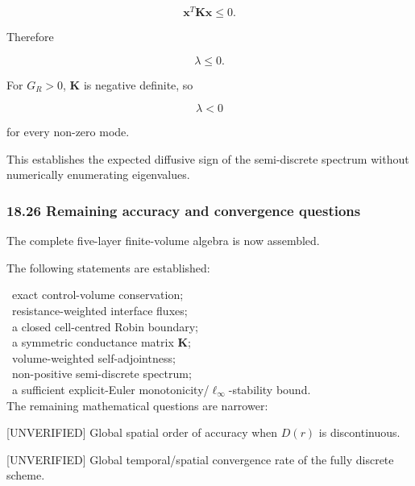 \documentclass[11pt,a4paper]{article}
\begin{document}
\begin{equation}
\mathbf x^T\mathbf K\mathbf x\le0.
\tag{TRISO-FV-310}
\label{eq:triso-fv-310}
\end{equation}

Therefore

\begin{equation}
\boxed{
\lambda\le0.
}
\tag{TRISO-FV-311}
\label{eq:triso-fv-311}
\end{equation}

For $G_R>0$, $\mathbf K$ is negative definite, so

\begin{equation}
\boxed{
\lambda<0
}
\tag{TRISO-FV-312}
\label{eq:triso-fv-312}
\end{equation}

for every non-zero mode.

This establishes the expected diffusive sign of the semi-discrete spectrum without numerically enumerating eigenvalues.

\subsubsection*{18.26 Remaining accuracy and convergence questions}

The complete five-layer finite-volume algebra is now assembled.

The following statements are established:

\noindent\textbullet\ exact control-volume conservation;\\
\noindent\textbullet\ resistance-weighted interface fluxes;\\
\noindent\textbullet\ a closed cell-centred Robin boundary;\\
\noindent\textbullet\ a symmetric conductance matrix $\mathbf K$;\\
\noindent\textbullet\ volume-weighted self-adjointness;\\
\noindent\textbullet\ non-positive semi-discrete spectrum;\\
\noindent\textbullet\ a sufficient explicit-Euler monotonicity/$\ell_\infty$-stability bound.\\

The remaining mathematical questions are narrower:

[UNVERIFIED] Global spatial order of accuracy when $D(r)$ is discontinuous.

[UNVERIFIED] Global temporal/spatial convergence rate of the fully discrete scheme.
\end{document}
